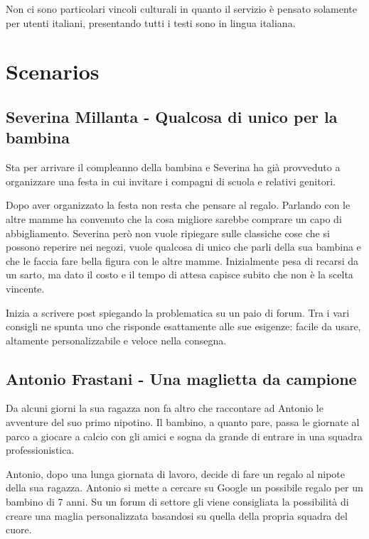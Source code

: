 \documentclass[12pt,italian,]{report}
\begin{document}
Non ci sono particolari vincoli culturali in quanto il servizio è pensato solamente per utenti italiani, presentando tutti i testi sono in lingua italiana. 

\section{Scenarios}\label{scenarios}

\hypertarget{severina-millanta---qualcosa-di-unico-per-la-bambina}{%
\subsection{Severina Millanta - Qualcosa di unico per la
bambina}\label{severina-millanta---qualcosa-di-unico-per-la-bambina}}

Sta per arrivare il compleanno della bambina e Severina ha già
provveduto a organizzare una festa in cui invitare i compagni di scuola
e relativi genitori.

Dopo aver organizzato la festa non resta che pensare al regalo. Parlando
con le altre mamme ha convenuto che la cosa migliore sarebbe comprare un
capo di abbigliamento. Severina però non vuole ripiegare sulle classiche
cose che si possono reperire nei negozi, vuole qualcosa di unico che
parli della sua bambina e che le faccia fare bella figura con le altre
mamme. Inizialmente pesa di recarsi da un sarto, ma dato il costo e il
tempo di attesa capisce subito che non è la scelta vincente.

Inizia a scrivere post spiegando la problematica su un paio di forum.
Tra i vari consigli ne spunta uno che risponde esattamente alle sue
esigenze: facile da usare, altamente personalizzabile e veloce nella
consegna.

\hypertarget{antonio-frastani---una-maglietta-da-campione}{%
\subsection{Antonio Frastani - Una maglietta da
campione}\label{antonio-frastani---una-maglietta-da-campione}}

Da alcuni giorni la sua ragazza non fa altro che raccontare ad Antonio
le avventure del suo primo nipotino. Il bambino, a quanto pare, passa le
giornate al parco a giocare a calcio con gli amici e sogna da grande di
entrare in una squadra professionistica.

Antonio, dopo una lunga giornata di lavoro, decide di fare un regalo al
nipote della sua ragazza. Antonio si mette a cercare su Google un
possibile regalo per un bambino di 7 anni. Su un forum di settore gli
viene consigliata la possibilità di creare una maglia personalizzata
basandosi su quella della propria squadra del cuore.
\end{document}
